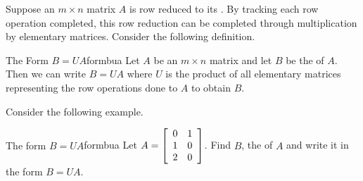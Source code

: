 Suppose an $m \times n$ matrix $A$ is row reduced to its {\rref}. By tracking each row operation completed, this row reduction can be completed through multiplication by elementary matrices. Consider the following definition.

\begin{definition}{The Form $B=UA$}{formbua}
Let $A$ be an $m \times n$ matrix and let $B$ be the {\rref} of $A$. Then we can write $B = UA$ where $U$ is the product of all elementary matrices representing the row operations done to $A$ to obtain $B$. 
\end{definition}

Consider the following example.

\begin{example}{The form $B=UA$}{formbua}
Let $A = \left[
\begin{array}{rr}
0 & 1 \\
1 & 0 \\
2 & 0
\end{array}
\right]$. Find $B$, the {\rref} of $A$ and write it in the form $B=UA$.
\end{example}

